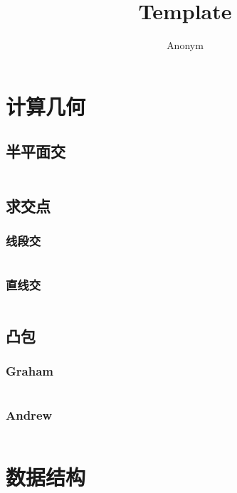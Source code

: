 \documentclass[a4paper]{article}
\title{Template}
\author{Anonym}
\newcommand{\cppcode}[1]{
    \inputminted[mathescape]{cpp}{#1}
}
\begin{document}
\maketitle

\tableofcontents

\clearpage



\section{计算几何}

\subsection{半平面交}

\cppcode{computation-geometry/HPI.cpp}

\subsection{求交点}

\subsubsection{线段交}

\cppcode{computation-geometry/int-of-seg.cpp}

\subsubsection{直线交}

\cppcode{computation-geometry/int-of-line.cpp}

\subsection{凸包}
\subsubsection{Graham}
\cppcode{computation-geometry/Graham.cpp}

\subsubsection{Andrew}
\cppcode{computation-geometry/Andrew.cpp}



\section{数据结构}
\end{document}
